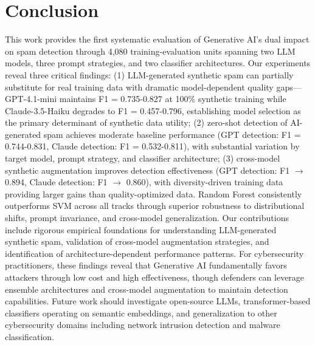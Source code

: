\section{Conclusion}
\label{sec:conclusion}

This work provides the first systematic evaluation of Generative AI's dual impact on spam detection through 4,080 training-evaluation units spanning two LLM models, three prompt strategies, and two classifier architectures. Our experiments reveal three critical findings: (1) LLM-generated synthetic spam can partially substitute for real training data with dramatic model-dependent quality gaps—GPT-4.1-mini maintains F1 = 0.735-0.827 at 100\% synthetic training while Claude-3.5-Haiku degrades to F1 = 0.457-0.796, establishing model selection as the primary determinant of synthetic data utility; (2) zero-shot detection of AI-generated spam achieves moderate baseline performance (GPT detection: F1 = 0.744-0.831, Claude detection: F1 = 0.532-0.811), with substantial variation by target model, prompt strategy, and classifier architecture; (3) cross-model synthetic augmentation improves detection effectiveness (GPT detection: F1 $\rightarrow$ 0.894, Claude detection: F1 $\rightarrow$ 0.860), with diversity-driven training data providing larger gains than quality-optimized data. Random Forest consistently outperforms SVM across all tracks through superior robustness to distributional shifts, prompt invariance, and cross-model generalization. Our contributions include rigorous empirical foundations for understanding LLM-generated synthetic spam, validation of cross-model augmentation strategies, and identification of architecture-dependent performance patterns. For cybersecurity practitioners, these findings reveal that Generative AI fundamentally favors attackers through low cost and high effectiveness, though defenders can leverage ensemble architectures and cross-model augmentation to maintain detection capabilities. Future work should investigate open-source LLMs, transformer-based classifiers operating on semantic embeddings, and generalization to other cybersecurity domains including network intrusion detection and malware classification.
